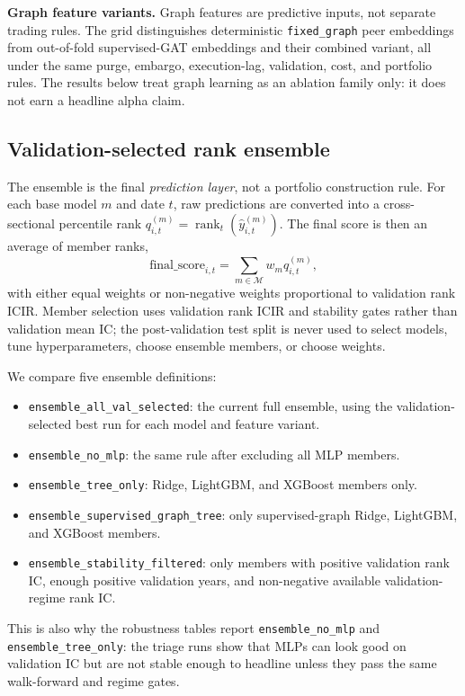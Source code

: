 \documentclass[9pt]{extarticle}
\begin{document}
\textbf{Graph feature variants.} Graph features are predictive inputs, not
separate trading rules. The grid distinguishes deterministic
\texttt{fixed\_graph} peer embeddings from out-of-fold supervised-GAT embeddings
and their combined variant, all under the same purge, embargo, execution-lag,
validation, cost, and portfolio rules. The results below treat graph learning as
an ablation family only: it does not earn a headline alpha claim.

\subsection{Validation-selected rank ensemble}
\label{sec:ensemble}
The ensemble is the final \emph{prediction layer}, not a portfolio construction
rule. For each base model $m$ and date $t$, raw predictions are converted into a
cross-sectional percentile rank
$q^{(m)}_{i,t}=\operatorname{rank}_{t}(\hat y^{(m)}_{i,t})$. The final score is
then an average of member ranks,
\[
  \text{final\_score}_{i,t}=\sum_{m\in\mathcal{M}} w_m q^{(m)}_{i,t},
\]
with either equal weights or non-negative weights proportional to validation
rank ICIR. Member selection uses validation rank ICIR and stability gates rather
than validation mean IC; the post-validation test split is never used to select
models, tune hyperparameters, choose ensemble members, or choose weights.

We compare five ensemble definitions:
\begin{itemize}
  \item \texttt{ensemble\_all\_val\_selected}: the current full ensemble, using
  the validation-selected best run for each model and feature variant.
  \item \texttt{ensemble\_no\_mlp}: the same rule after excluding all MLP members.
  \item \texttt{ensemble\_tree\_only}: Ridge, LightGBM, and XGBoost members only.
  \item \texttt{ensemble\_supervised\_graph\_tree}: only supervised-graph Ridge,
  LightGBM, and XGBoost members.
  \item \texttt{ensemble\_stability\_filtered}: only members with positive
  validation rank IC, enough positive validation years, and non-negative
  available validation-regime rank IC.
\end{itemize}
This is also why the robustness tables report \texttt{ensemble\_no\_mlp} and
\texttt{ensemble\_tree\_only}: the triage runs show that MLPs can look good on
validation IC but are not stable enough to headline unless they pass the same
walk-forward and regime gates.
\end{document}
